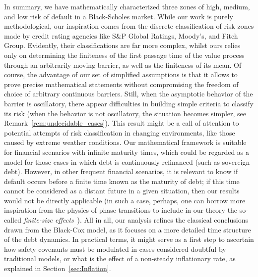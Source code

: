 \documentclass[12pt]{article}
\theoremstyle{definition}
\begin{document}
In summary, we have mathematically characterized three zones of high, medium, and low risk of default in a Black-Scholes market. While our work is purely methodological, our inspiration comes from the discrete classification of risk zones made by credit rating agencies like S\&P Global Ratings, Moody's, and Fitch Group. Evidently, their classifications are far more complex, whilst ours relies only on determining the finiteness of the first passage time of the value process through an arbitrarily moving barrier, as well as the finiteness of its mean. Of course, the advantage of our set of simplified assumptions is that it allows to prove precise mathematical statements
without compromising the freedom of choice of arbitrary continuous barriers. Still, when the asymptotic behavior of the barrier is oscillatory, there appear difficulties in building simple criteria to classify its risk (when the behavior is not oscillatory, the situation becomes simpler, see Remark~\ref{rem:undecidable_cases}). This result might be a call of attention to potential attempts of risk classification in changing environments, like those caused by extreme weather conditions. Our mathematical framework is suitable for financial scenarios with infinite maturity times, which could be regarded as a model for those cases in which debt is continuously refinanced (such as sovereign debt). However, in other frequent financial scenarios, it is relevant to know if default occurs before a finite time known as the maturity of debt; if this time cannot be considered as a distant future in a given situation, then our results would not be directly applicable (in such a case, perhaps, one can borrow more inspiration from the physics of phase transitions to include in our theory the so-called {\it finite-size effects}~\cite{quantum2021zinn}). All in all, our analysis refines the classical conclusions drawn from the Black-Cox model, as it focuses on a more detailed time structure of the debt dynamics. In practical terms, it might serve as a first step to ascertain how safety covenants must be modulated in cases considered doubtful by traditional models, or what is the effect of a non-steady inflationary rate, as explained in Section~\ref{sec:Inflation}.
\end{document}
